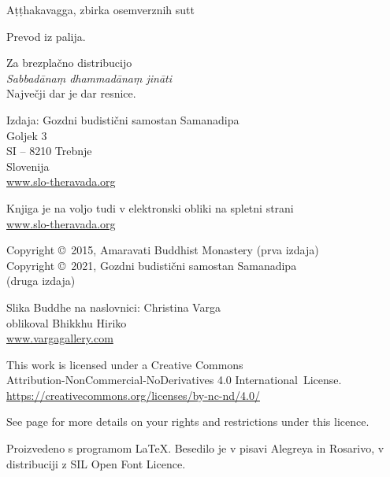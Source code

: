 \cleartoverso

\thispagestyle{empty}

{\smaller\setlength{\parskip}{0.5em}\setlength{\parindent}{0em}%
{\raggedright

Aṭṭhakavagga, zbirka osemverznih sutt

Prevod iz palija.

Za brezplačno distribucijo\\
\emph{Sabbadānaṃ dhammadānaṃ jināti}\\
Največji dar je dar resnice.

Izdaja: Gozdni budistični samostan Samanadipa\\
Goljek 3\\
SI -- 8210 Trebnje\\
Slovenija\\
\href{http://www.slo-theravada.org}{www.slo-theravada.org}

Knjiga je na voljo tudi v elektronski obliki na spletni strani\\
\href{https://slo-theravada.org}{www.slo-theravada.org}

Copyright \copyright\ 2015, Amaravati Buddhist Monastery (prva izdaja)\\
Copyright \copyright\ 2021, Gozdni budistični samostan Samanadipa\\ (druga izdaja)

Slika Buddhe na naslovnici: Christina Varga\\
oblikoval Bhikkhu Hiriko\\
\href{http://vargagallery.com}{www.vargagallery.com}

This work is licensed under a Creative Commons\\
Attribution-NonCommercial-NoDerivatives 4.0 International~License.\\
\href{https://creativecommons.org/licenses/by-nc-nd/4.0/}{https://creativecommons.org/licenses/by-nc-nd/4.0/}

See page \pageref{copyright-details} for more details on your rights and restrictions under this licence.

Proizvedeno s programom \LaTeX. Besedilo je v pisavi Alegreya in Rosarivo, v distribuciji z SIL Open Font Licence.

\theEditionInfo

}}


